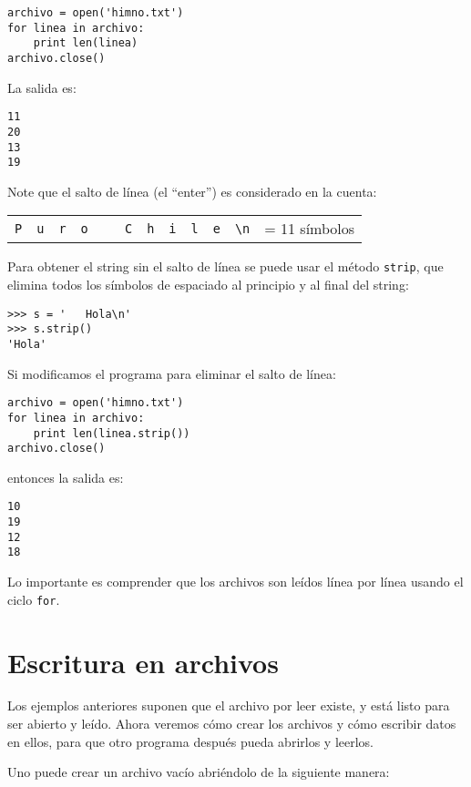\begin{lstlisting}
archivo = open('himno.txt')
for linea in archivo:
    print len(linea)
archivo.close()
\end{lstlisting}

La salida es:
\begin{lstlisting}[language=testcase]
11
20
13
19
\end{lstlisting}

Note que el salto de línea (el ``enter'') es considerado en la cuenta:

\begin{tabular}{|*{11}{c|}l}
  \cline{1-11}
  \lstinline!P! &
  \lstinline!u! &
  \lstinline!r! &
  \lstinline!o! &
  \lstinline! ! &
  \lstinline!C! &
  \lstinline!h! &
  \lstinline!i! &
  \lstinline!l! &
  \lstinline!e! &
  \lstinline!\n! &
  = 11 símbolos \\
  \cline{1-11}
\end{tabular}

Para obtener el string sin el salto de línea se puede usar el método
\lstinline!strip!, que elimina todos los símbolos de espaciado al
principio y al final del string:

\begin{lstlisting}
>>> s = '   Hola\n'
>>> s.strip()
'Hola'
\end{lstlisting}

Si modificamos el programa para eliminar el salto de línea:

\begin{lstlisting}
archivo = open('himno.txt')
for linea in archivo:
    print len(linea.strip())
archivo.close()
\end{lstlisting}
entonces la salida es:
\begin{lstlisting}[language=testcase]
10
19
12
18
\end{lstlisting}

Lo importante es comprender que los archivos son leídos línea por línea
usando el ciclo \lstinline!for!.

\section{Escritura en archivos}

Los ejemplos anteriores suponen que el archivo por leer existe, y está
listo para ser abierto y leído. Ahora veremos cómo crear los archivos y
cómo escribir datos en ellos, para que otro programa después pueda
abrirlos y leerlos.

Uno puede crear un archivo vacío abriéndolo de la siguiente manera:

